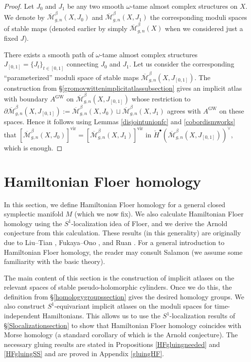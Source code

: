 \documentclass[12pt]{article}
\theoremstyle{definition}
\theoremstyle{remark}
\numberwithin{equation}{subsection}
\newcommand{\cH}{\check H}
\newcommand{\Mbar}{\overline{\mathcal M}}
\newcommand{\vir}{\mathrm{vir}}
\newcommand{\GW}{\mathrm{GW}}
\begin{document}
\begin{proof}
Let $J_0$ and $J_1$ be any two smooth $\omega$-tame almost complex structures on $X$.  We denote by $\Mbar_{g,n}^\beta(X,J_0)$ and $\Mbar_{g,n}^\beta(X,J_1)$ the corresponding moduli spaces of stable maps (denoted earlier by simply $\Mbar_{g,n}^\beta(X)$ when we considered just a fixed $J$).

There exists a smooth path of $\omega$-tame almost complex structures $J_{[0,1]}=\{J_t\}_{t\in[0,1]}$ connecting $J_0$ and $J_1$.  Let us consider the corresponding ``parameterized'' moduli space of stable maps $\Mbar_{g,n}^\beta(X,J_{[0,1]})$.  The construction from \S\ref{gromovwittenimplicitatlassubsection} gives an implicit atlas with boundary $A^\GW$ on $\Mbar_{g,n}^\beta(X,J_{[0,1]})$ whose restriction to $\partial\Mbar_{g,n}^\beta(X,J_{[0,1]}):=\Mbar_{g,n}^\beta(X,J_0)\sqcup\Mbar_{g,n}^\beta(X,J_1)$ agrees with $A^\GW$ on these spaces.  Hence it follows using Lemmas \ref{disjointunionfc} and \ref{cobordismworks} that $[\Mbar_{g,n}^\beta(X,J_0)]^\vir=[\Mbar_{g,n}^\beta(X,J_1)]^\vir$ in $\cH^\bullet(\Mbar_{g,n}^\beta(X,J_{[0,1]}))^\vee$, which is enough.
\end{proof}

\section{Hamiltonian Floer homology}\label{hamiltonianfloersec}

In this section, we define Hamiltonian Floer homology for a general closed symplectic manifold $M$ (which we now fix).  We also calculate Hamiltonian Floer homology using the $S^1$-localization idea of Floer, and we derive the Arnold conjecture from this calculation.  These results (in this generality) are originally due to Liu--Tian \cite{liutian}, Fukaya--Ono \cite{fukayaono}, and Ruan \cite{ruan}.  For a general introduction to Hamiltonian Floer homology, the reader may consult Salamon \cite{salamonnotes} (we assume some familiarity with the basic theory).

The main content of this section is the construction of implicit atlases on the relevant spaces of stable pseudo-holomorphic cylinders.  Once we do this, the definition from \S\ref{homologygroupssection} gives the desired homology groups.  We also construct $S^1$-equivariant implicit atlases on the moduli spaces for time-independent Hamiltonians.  This allows us to use the $S^1$-localization results of \S\ref{Slocalizationsection} to show that Hamiltonian Floer homology coincides with Morse homology (a standard corollary of which is the Arnold conjecture).  The necessary gluing results are stated in Propositions \ref{HFgluingneeded} and \ref{HFgluingSS} and are proved in Appendix \ref{gluingHF}.
\end{document}
